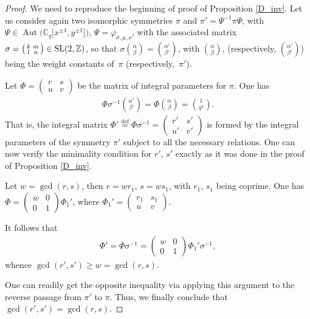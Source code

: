\documentclass[10pt,a4paper]{amsart}
\numberwithin{equation}{section}
\begin{document}
\begin{proof} We need to reproduce the beginning of proof of Proposition \ref{D_inv}. Let us consider again two isomorphic symmetries $\pi$ and $\pi'=\Psi^{-1}\pi\Psi$, with $\Psi\in\operatorname{Aut}\big(\mathbb{C}_q\big[x^{\pm 1},y^{\pm 1}\big]\big)$, $\Psi=\varphi_{\sigma,\mu,\nu}$, with the associated matrix $\sigma=\left(\begin{smallmatrix}k & m\\ l & n\end{smallmatrix}\right)\in {\rm SL}(2,\mathbb{Z})$, so that $\sigma\binom\alpha\beta=\binom{\alpha'}{\beta'}$, with $\binom\alpha\beta$, (respectively, $\binom{\alpha'}{\beta'}$) being the weight constants of~$\pi$ (respectively,~$\pi'$).

Let $\Phi=\left(\begin{smallmatrix}r & s\\ u & v\end{smallmatrix}\right)$ be the matrix of integral parameters for $\pi$. One has
\begin{gather*}
\Phi\sigma^{-1}\binom{\alpha'}{\beta'}=\Phi\binom\alpha\beta=\binom{1}{q^2}.
\end{gather*}
That is, the integral matrix $\Phi'\stackrel{\mathrm{def}}{=}\Phi\sigma^{-1}=\left(\begin{smallmatrix}r' & s'\\ u' & v'\end{smallmatrix}\right)$ is formed by the integral parameters of the symmetry $\pi'$ subject to all the necessary relations. One can now verify the minimality condition for $r'$, $s'$ exactly as it was done in the proof of Proposition \ref{D_inv}.

Let $w=\operatorname{gcd}(r,s)$, then $r=wr_1$, $s=ws_1$, with $r_1$, $s_1$ being coprime. One has $\Phi=\left(\begin{smallmatrix}w & 0\\ 0 & 1\end{smallmatrix}\right)\Phi_1'$, where $\Phi_1'=\left(\begin{smallmatrix}r_1 & s_1\\ u & v\end{smallmatrix}\right)$.

It follows that
\begin{gather*}
\Phi'=\Phi\sigma^{-1}=\begin{pmatrix}w & 0\\ 0 & 1\end{pmatrix}\Phi_1'\sigma^{-1},
\end{gather*}
whence $\operatorname{gcd}(r',s')\ge w=\operatorname{gcd}(r,s)$.

One can readily get the opposite inequality via applying this argument to the reverse passage from $\pi'$ to $\pi$. Thus, we finally conclude that $\operatorname{gcd}(r',s')=\operatorname{gcd}(r,s)$.
\end{proof}
\end{document}
